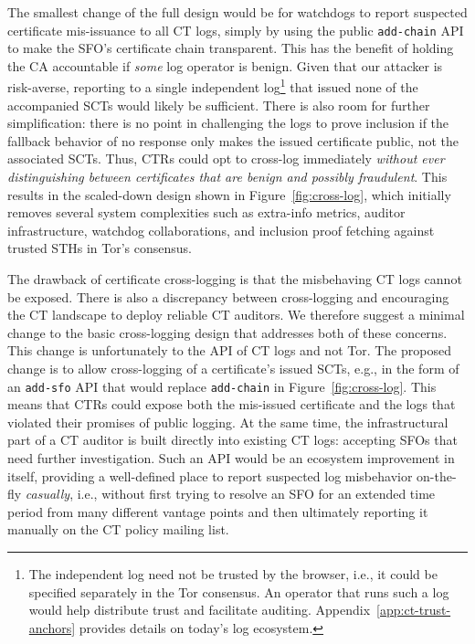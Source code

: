 The smallest change of the full design would be for watchdogs to report
suspected certificate mis-issuance to all CT logs, simply by using the public
\texttt{add-chain} API to make the SFO's certificate chain transparent.  This
has the benefit of holding the CA accountable if \emph{some} log operator is
benign.  Given that our attacker is risk-averse, reporting to a single
independent log\footnote{The independent log need not be trusted by the browser,
i.e., it could be specified separately in the Tor consensus.  An operator that
runs such a log would help distribute trust and facilitate auditing.
Appendix~\ref{app:ct-trust-anchors} provides details on today's log ecosystem.}
that issued none of the accompanied SCTs would likely be sufficient.  There is
also room for further simplification: there is no point in challenging the logs
to prove inclusion if the fallback behavior of no response only makes the issued
certificate public, not the associated SCTs. Thus, CTRs could opt to cross-log
immediately \emph{without ever distinguishing between certificates that are
benign and possibly fraudulent}.  This results in the scaled-down design shown
in Figure~\ref{fig:cross-log}, which initially removes several system
complexities such as extra-info metrics, auditor infrastructure, watchdog
collaborations, and inclusion proof fetching against trusted STHs in Tor's
consensus.

The drawback of certificate cross-logging is that the misbehaving CT logs cannot
be exposed.  There is also a discrepancy between cross-logging and encouraging
the CT landscape to deploy reliable CT auditors.  We therefore suggest a
minimal change to the basic cross-logging design that addresses both of these
concerns.  This change is unfortunately to the API of CT logs and not Tor.  The
proposed change is to allow cross-logging of a certificate's issued SCTs, e.g.,
in the form of an \texttt{add-sfo} API that would replace \texttt{add-chain}
in Figure~\ref{fig:cross-log}.
This means that CTRs could expose both the mis-issued certificate and the logs
that violated their promises of public logging.  At the same time, the
infrastructural part of a CT auditor is built directly into existing
CT logs:
	accepting SFOs that need further investigation.
Such an API would be an ecosystem improvement in itself, providing a
well-defined place to report suspected log misbehavior on-the-fly
\emph{casually}, i.e., without first trying to resolve an SFO for an extended
time period from many different vantage points and then ultimately reporting it
manually on the CT policy mailing list.

